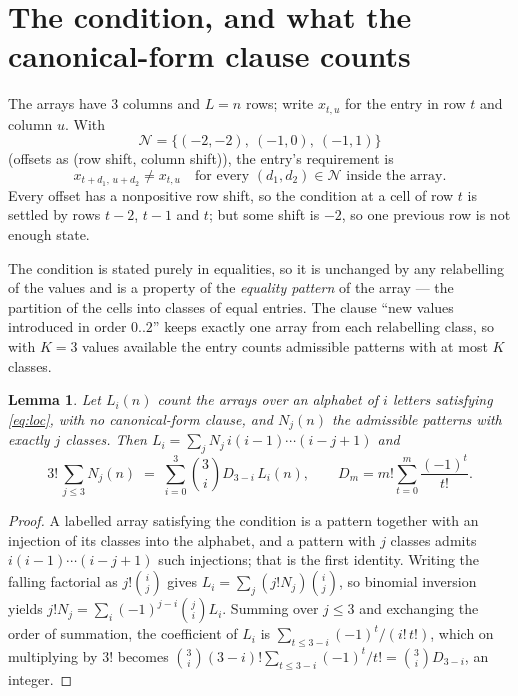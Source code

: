 \documentclass[11pt,a4paper]{article}
\theoremstyle{plain}
\newtheorem{lemma}[theorem]{Lemma}
\theoremstyle{definition}
\begin{document}
\section{The condition, and what the canonical-form clause counts}

The arrays have $3$ columns and $L=n$ rows; write $x_{t,u}$ for the entry in
row $t$ and column $u$. With
\[
\mathcal N=\{(-2,-2),\ (-1,0),\ (-1,1)\}
\]
(offsets as (row shift, column shift)), the entry's requirement is
\begin{equation}\label{eq:loc}
x_{t+d_1,\,u+d_2}\ne x_{t,u}\quad\text{for every }(d_1,d_2)\in\mathcal N\text{ inside the array}.
\end{equation}
Every offset has a nonpositive row shift, so the condition at a cell of row $t$ is
settled by rows $t-2$, $t-1$ and $t$; but some shift is $-2$, so one previous row is not
enough state.

The condition is stated purely in equalities, so it is unchanged by any relabelling of the
values and is a property of the \emph{equality pattern} of the array --- the partition of
the cells into classes of equal entries. The clause ``new values introduced in order
$0..2$'' keeps exactly one array from each relabelling class, so with $K=3$ values
available the entry counts admissible patterns with at most $K$ classes.

\begin{lemma}\label{lem:inv}
Let $L_i(n)$ count the arrays over an alphabet of $i$ letters satisfying \eqref{eq:loc},
with no canonical-form clause, and $N_j(n)$ the admissible patterns with exactly $j$ classes.
Then $L_i=\sum_j N_j\,i(i-1)\cdots(i-j+1)$ and
\[
3!\,\sum_{j\le 3}N_j(n)\;=\;\sum_{i=0}^{3}\binom{3}{i}D_{3-i}\,L_i(n),
\qquad D_m=m!\sum_{t=0}^{m}\frac{(-1)^t}{t!} .
\]
\end{lemma}

\begin{proof}
A labelled array satisfying the condition is a pattern together with an injection of its
classes into the alphabet, and a pattern with $j$ classes admits $i(i-1)\cdots(i-j+1)$ such
injections; that is the first identity. Writing the falling factorial as $j!\binom{i}{j}$
gives $L_i=\sum_j(j!N_j)\binom{i}{j}$, so binomial inversion yields
$j!N_j=\sum_i(-1)^{j-i}\binom{j}{i}L_i$. Summing over $j\le3$ and exchanging the
order of summation, the coefficient of $L_i$ is $\sum_{t\le3-i}(-1)^t/(i!\,t!)$, which on
multiplying by $3!$ becomes
$\binom{3}{i}(3-i)!\sum_{t\le3-i}(-1)^t/t!=\binom{3}{i}D_{3-i}$, an
integer.
\end{proof}
\end{document}
